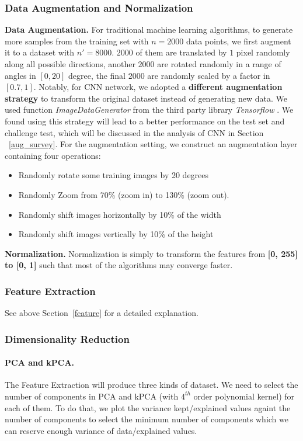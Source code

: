 \documentclass{article}
\begin{document}
\subsubsection{Data Augmentation and Normalization}
\textbf{Data Augmentation. } For traditional machine learning algorithms, to generate more samples from the training set with $n=2000$ data points, we first augment it to a dataset with $n' = 8000$. $2000$ of them are translated by $1$ pixel randomly along all possible directions, another $2000$ are rotated randomly in a range of angles in $[0, 20]$ degree, the final $2000$ are randomly scaled by a factor in $[0.7, 1]$. Notably, for CNN network, we adopted a \textbf{different augmentation strategy} to transform the original dataset instead of generating new data. We used function \emph{ImageDataGenerator} from the third party library \emph{Tensorflow} \cite{tensorflow2015-whitepaper}. We found using this strategy will lead to a better performance on the test set and challenge test, which will be discussed in the analysis of CNN in Section ~\ref{aug_survey}. For the augmentation setting, we construct an augmentation layer containing four operations:
\begin{itemize}
    \item{Randomly rotate some training images by 20 degrees}
    \item{Randomly Zoom from 70\% (zoom in) to 130\% (zoom out). }
    \item{Randomly shift images horizontally by 10\% of the width}
    \item{Randomly shift images vertically by 10\% of the height}
\end{itemize}
\textbf{Normalization.} Normalization is simply to transform the features from \textbf{[0, 255] to [0, 1]} such that most of the algorithms may converge faster.
\subsubsection{Feature Extraction}
See above Section~\ref{feature} for a detailed explanation.
\subsubsection{Dimensionality Reduction}
\paragraph{PCA and kPCA.}
The Feature Extraction will produce three kinds of dataset. We need to select the number of components in PCA and kPCA (with $4^{th}$ order polynomial kernel) for each of them. To do that, we plot the variance kept/explained values againt the number of components to select the minimum number of components which we can reserve enough variance of data/explained values.
\end{document}
